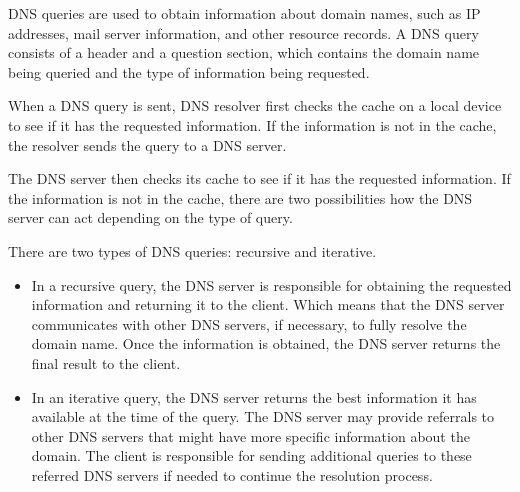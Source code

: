 \documentclass[a4paper, 11pt]{article}
\begin{document}


        DNS queries are used to obtain information about domain names, such as IP addresses, mail server information, and other resource records.
        A DNS query consists of a header and a question section, which contains the domain name being queried and the type of information being requested.

        When a DNS query is sent, DNS resolver first checks the cache on a local device to see if it has the requested information.
        If the information is not in the cache, the resolver sends the query to a DNS server.

        The DNS server then checks its cache to see if it has the requested information.
        If the information is not in the cache, there are two possibilities how the DNS server can act depending on the type of query.

        There are two types of DNS queries: recursive and iterative.
        \begin{itemize}
            \item In a recursive query, the DNS server is responsible for obtaining the requested information and returning it to the client. 
                Which means that the DNS server communicates with other DNS servers, 
                if necessary, to fully resolve the domain name. Once the information is obtained, 
                the DNS server returns the final result to the client.
        
            \item In an iterative query, the DNS server returns the best information it has available at the time of the query. 
                The DNS server may provide referrals to other DNS servers that might have more specific information about the domain. 
                The client is responsible for sending additional queries to these referred DNS servers if needed to continue the resolution process. 
        \end{itemize} 
        
\end{document}
